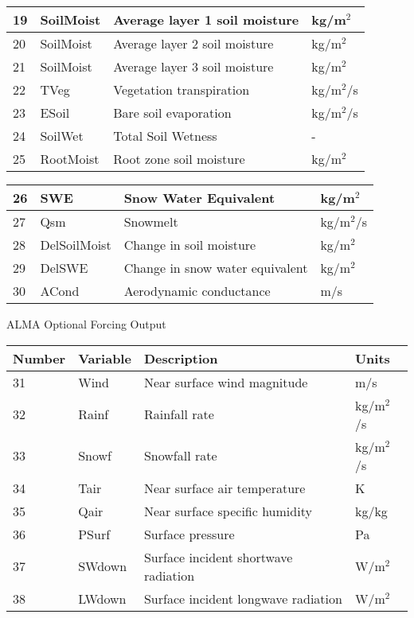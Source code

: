 \begin{tabular}{|l|l|l|l|}
19 & SoilMoist    & Average layer 1 soil moisture   & kg/m$^2$      \\ \hline
20 & SoilMoist    & Average layer 2 soil moisture   & kg/m$^2$      \\ \hline
21 & SoilMoist    & Average layer 3 soil moisture   & kg/m$^2$      \\ \hline
22 & TVeg         & Vegetation transpiration        & kg/m$^2$/s    \\ \hline
23 & ESoil        & Bare soil evaporation           & kg/m$^2$/s    \\ \hline
24 & SoilWet      & Total Soil Wetness              & -             \\ \hline
25 & RootMoist    & Root zone soil moisture         & kg/m$^2$      \\ \hline
\end{tabular}

\begin{tabular}{|l|l|l|l|} \hline
26 & SWE          & Snow Water Equivalent           & kg/m$^2$      \\ \hline
27 & Qsm          & Snowmelt                        & kg/m$^2$/s    \\ \hline
28 & DelSoilMoist & Change in soil moisture         & kg/m$^2$      \\ \hline
29 & DelSWE       & Change in snow water equivalent & kg/m$^2$      \\ \hline
30 & ACond        & Aerodynamic conductance         & m/s           \\ \hline
\end{tabular}

\nextpar

\nextpar

ALMA Optional Forcing Output

\begin{tabular}{|l|l|l|l|} \hline
Number & Variable & Description                     & Units         \\ \hline
31 & Wind   & Near surface wind magnitude           & m/s           \\ \hline
32 & Rainf  & Rainfall rate                         & kg/m$^2$/s    \\ \hline
33 & Snowf  & Snowfall rate                         & kg/m$^2$/s    \\ \hline
34 & Tair   & Near surface air temperature          & K             \\ \hline
35 & Qair   & Near surface specific humidity        & kg/kg         \\ \hline
36 & PSurf  & Surface pressure                      & Pa            \\ \hline
37 & SWdown & Surface incident shortwave radiation  & W/m$^2$       \\ \hline
38 & LWdown & Surface incident longwave radiation   & W/m$^2$       \\ \hline
\end{tabular}

\setlength{\extrarowheight}{0pt}

